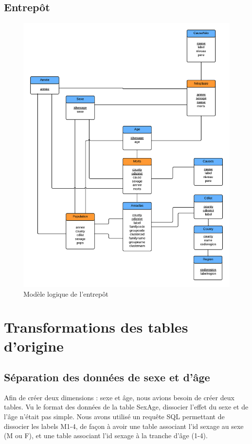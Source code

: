 \section{Entrepôt}
\begin{figure}[h]
    \centering
    \includegraphics[width=0.8\linewidth]{images/entrepot.png}
    \caption{Modèle logique de l'entrepôt}
    \label{conception_cube_néoplasies}
\end{figure}


\chapter{Transformations des tables d'origine}

\section{Séparation des données de sexe et d'âge}

    Afin de créer deux dimensions : sexe et âge, nous avions besoin de créer deux tables. Vu le format des données de la table SexAge, dissocier l'effet du sexe et de l'âge n'était pas simple. Nous avons utilisé un requête SQL permettant de dissocier les labels M1-4, de façon à avoir une table associant l'id sexage au sexe (M ou F), et une table associant l'id sexage à la tranche d'âge (1-4).

